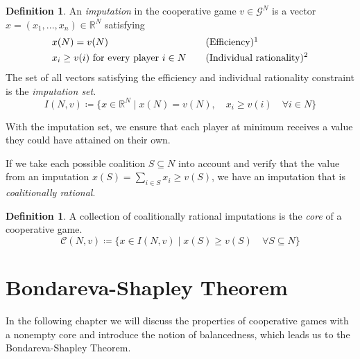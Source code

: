 \documentclass[10pt,a4paper,titlepage]{article}
\theoremstyle{plain}
\theoremstyle{definition}
\newtheorem{definition}[thm]{Definition} %
\begin{document}
\begin{definition}
    An \textit{imputation} in the cooperative game $v \in \mathcal{G}^N$ is a vector $x = (x_1, ..., x_n) \in \mathbb{R}^N$ satisfying
    \[
        \begin{aligned}
            &x(N) = v(N) && \quad \text{(Efficiency)}\footnotemark\\
            &x_i \geq v(i)\text{ for every player } i \in N && \quad \text{(Individual rationality)\footnotemark}
        \end{aligned}
    \]
    The set of all vectors satisfying the efficiency and individual rationality constraint is the \textit{imputation set}.
    \begin{equation}\label{eq:imputation}
        I(N, v) \coloneqq \{x \in \mathbb{R}^N \mid x(N) = v(N),\quad x_i \geq v(i) \quad \forall i \in N\}
    \end{equation}
\end{definition}

With the imputation set, we ensure that each player at minimum receives a value they could have attained on their own.

If we take each possible coalition $S \subseteq N$ into account and verify that the value from an imputation $x(S) = \sum_{i \in S}x_i \geq v(S)$, we have an imputation that is \textit{coalitionally rational}.

\begin{definition}\label{def:core}
    A collection of coalitionally rational imputations is the \textit{core} of a cooperative game.
    \begin{equation}\label{eq:core}
        \mathcal{C}(N, v) \coloneqq \{x \in I(N, v) \mid x(S) \geq v(S)\quad \forall S \subseteq N\}
    \end{equation}
\end{definition}

 \section{Bondareva-Shapley Theorem}
 In the following chapter we will discuss the properties of cooperative games with a nonempty core and introduce the notion of balancedness, which leads us to the Bondareva-Shapley Theorem.
\end{document}
